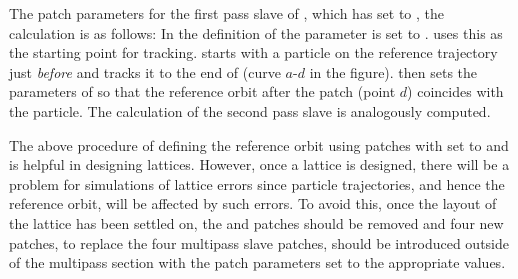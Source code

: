 The patch parameters for the  first pass slave of ,
which has  set to , the calculation is as
follows: In the definition of  the  parameter is
set to . \bmad uses this as the starting point for
tracking. \bmad starts with a particle on the reference trajectory
just {\em before}  and tracks it to the end of  (curve
$a$-$d$ in the figure). \bmad then sets the parameters of 
so that the reference orbit after the patch (point $d$) coincides
with the particle. The calculation of the second pass slave 
is analogously computed.

The above procedure of defining the reference orbit using patches with
 set to  and  is helpful in
designing lattices. However, once a lattice is designed, there will be
a problem for simulations of lattice errors since particle
trajectories, and hence the reference orbit, will be affected by such
errors. To avoid this, once the layout of the lattice has been settled
on, the  and  patches should be removed and
four new patches, to replace the four multipass slave patches, should
be introduced outside of the multipass section with the patch
parameters set to the appropriate values.
